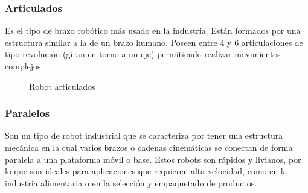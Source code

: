 \subsubsection{Articulados}
Es el tipo de brazo robótico más usado en la industria. Están formados por una estructura similar a la de un brazo humano. Poseen entre 4 y 6 articulaciones de tipo 
revolución (giran en torno a un eje) permitiendo realizar movimientos complejos. 
\begin{figure} [h!]
  \centering    
  \hspace{1.5cm}
  \caption{Robot articulados}
\end{figure}

\subsubsection{Paralelos}
Son un tipo de robot industrial que se caracteriza por tener una estructura mecánica en la cual varios brazos o cadenas cinemáticas se conectan de forma paralela a una plataforma móvil o 
base. Estos robots son rápidos y livianos, por lo que son ideales para aplicaciones que requieren alta velocidad, como en la industria alimentaria o en la selección y
empaquetado de productos.


